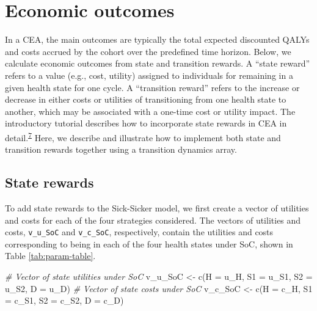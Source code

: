 \documentclass[
]{article}
\newenvironment{Shaded}{\begin{snugshade}}{\end{snugshade}}
\newcommand{\AttributeTok}[1]{\textcolor[rgb]{0.77,0.63,0.00}{#1}}
\newcommand{\CommentTok}[1]{\textcolor[rgb]{0.56,0.35,0.01}{\textit{#1}}}
\newcommand{\FunctionTok}[1]{\textcolor[rgb]{0.00,0.00,0.00}{#1}}
\newcommand{\NormalTok}[1]{#1}
\newcommand{\OtherTok}[1]{\textcolor[rgb]{0.56,0.35,0.01}{#1}}
\begin{document}
\hypertarget{economic-outcomes}{%
\section{Economic outcomes}\label{economic-outcomes}}

In a CEA, the main outcomes are typically the total expected discounted QALYs and costs accrued by the cohort over the predefined time horizon. Below, we calculate economic outcomes from state and transition rewards. A ``state reward'' refers to a value (e.g., cost, utility) assigned to individuals for remaining in a given health state for one cycle. A ``transition reward'' refers to the increase or decrease in either costs or utilities of transitioning from one health state to another, which may be associated with a one-time cost or utility impact. The introductory tutorial describes how to incorporate state rewards in CEA in detail.\textsuperscript{\protect\hyperlink{ref-Alarid-Escudero2022b}{7}} Here, we describe and illustrate how to implement both state and transition rewards together using a transition dynamics array.

\hypertarget{state-rewards}{%
\subsection{State rewards}\label{state-rewards}}

To add state rewards to the Sick-Sicker model, we first create a vector of utilities and costs for each of the four strategies considered. The vectors of utilities and costs, \texttt{v\_u\_SoC} and \texttt{v\_c\_SoC}, respectively, contain the utilities and costs corresponding to being in each of the four health states under SoC, shown in Table \ref{tab:param-table}.

\begin{Shaded}
\begin{Highlighting}[]
\CommentTok{\# Vector of state utilities under SoC}
\NormalTok{v\_u\_SoC }\OtherTok{\textless{}{-}} \FunctionTok{c}\NormalTok{(}\AttributeTok{H =}\NormalTok{ u\_H, }\AttributeTok{S1 =}\NormalTok{ u\_S1, }\AttributeTok{S2 =}\NormalTok{ u\_S2, }\AttributeTok{D =}\NormalTok{ u\_D)}
\CommentTok{\# Vector of state costs under SoC}
\NormalTok{v\_c\_SoC }\OtherTok{\textless{}{-}} \FunctionTok{c}\NormalTok{(}\AttributeTok{H =}\NormalTok{ c\_H, }\AttributeTok{S1 =}\NormalTok{ c\_S1, }\AttributeTok{S2 =}\NormalTok{ c\_S2, }\AttributeTok{D =}\NormalTok{ c\_D)}
\end{Highlighting}
\end{Shaded}
\end{document}
